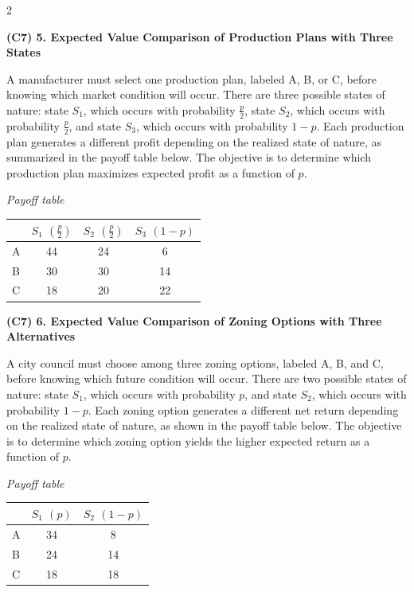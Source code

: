 \documentclass[12pt]{article}
\newcommand{\SubsectionBox}[1]{%
	\noindent\colorbox{gray!30}{%
		\parbox{\linewidth}{\textbf{#1}}%
	}\par\vspace{0.35cm}%
}
\begin{document}
\begin{multicols}{2}
		\vspace{0.25cm}
		\SubsectionBox{(C7) 5. Expected Value Comparison of Production Plans with Three States}\vspace{-0.25cm}
		A manufacturer must select one production plan, labeled A, B, or C, before knowing which market condition will occur.
		There are three possible states of nature: state $S_1$, which occurs with probability $\frac{p}{2}$,
		state $S_2$, which occurs with probability $\frac{p}{2}$, and state $S_3$, which occurs with probability $1-p$.
		Each production plan generates a different profit depending on the realized state of nature, as summarized in the payoff table below.
		The objective is to determine which production plan maximizes expected profit as a function of $p$.
		
		\begin{center}
			\textit{Payoff table} \\
			\begin{tabular}{l c c c}
				\hline
				& $S_1$ $\left(\frac{p}{2}\right)$ & $S_2$ $\left(\frac{p}{2}\right)$ & $S_3$ $(1-p)$ \\
				\hline
				A & 44 & 24 & 6 \\
				B & 30 & 30 & 14 \\
				C & 18 & 20 & 22 \\
				\hline
			\end{tabular}
		\end{center}
		
		\vspace{0.25cm}
		\SubsectionBox{(C7) 6. Expected Value Comparison of Zoning Options with Three Alternatives}\vspace{-0.25cm}
		A city council must choose among three zoning options, labeled A, B, and C, before knowing which future condition will occur.
		There are two possible states of nature: state $S_1$, which occurs with probability $p$, and state $S_2$, which occurs with probability $1-p$.
		Each zoning option generates a different net return depending on the realized state of nature, as shown in the payoff table below.
		The objective is to determine which zoning option yields the higher expected return as a function of $p$.
		
		\begin{center}
			\textit{Payoff table} \\
			\begin{tabular}{l c c}
				\hline
				& $S_1$ $(p)$ & $S_2$ $(1-p)$ \\
				\hline
				A & 34 & 8 \\
				B & 24 & 14 \\
				C & 18 & 18 \\
				\hline
			\end{tabular}
		\end{center}
		
	\end{multicols}
	
\end{document}
